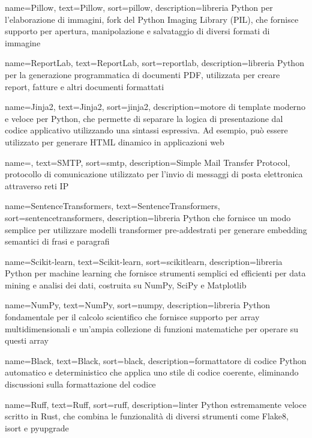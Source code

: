  {
    name=Pillow,
    text=Pillow,
    sort=pillow,
    description={libreria Python per l'elaborazione di immagini, fork del Python Imaging Library (PIL), che fornisce supporto per apertura, manipolazione e salvataggio di diversi formati di immagine}
}

 {
    name=ReportLab,
    text=ReportLab,
    sort=reportlab,
    description={libreria Python per la generazione programmatica di documenti PDF, utilizzata per creare report, fatture e altri documenti formattati}
}

 {
    name=Jinja2,
    text=Jinja2,
    sort=jinja2,
    description={motore di template moderno e veloce per Python, che permette di separare la logica di presentazione dal codice applicativo utilizzando una sintassi espressiva. Ad esempio, può essere utilizzato per generare HTML dinamico in applicazioni web}
}

 {
    name=,
    text=SMTP,
    sort=smtp,
    description={Simple Mail Transfer Protocol, protocollo di comunicazione utilizzato per l'invio di messaggi di posta elettronica attraverso reti IP}
}

 {
    name=SentenceTransformers,
    text=SentenceTransformers,
    sort=sentencetransformers,
    description={libreria Python che fornisce un modo semplice per utilizzare modelli transformer pre-addestrati per generare embedding semantici di frasi e paragrafi}
}

 {
    name=Scikit-learn,
    text=Scikit-learn,
    sort=scikitlearn,
    description={libreria Python per machine learning che fornisce strumenti semplici ed efficienti per data mining e analisi dei dati, costruita su NumPy, SciPy e Matplotlib}
}

 {
    name=NumPy,
    text=NumPy,
    sort=numpy,
    description={libreria Python fondamentale per il calcolo scientifico che fornisce supporto per array multidimensionali e un'ampia collezione di funzioni matematiche per operare su questi array}
}

 {
    name=Black,
    text=Black,
    sort=black,
    description={formattatore di codice Python automatico e deterministico che applica uno stile di codice coerente, eliminando discussioni sulla formattazione del codice}
}

 {
    name=Ruff,
    text=Ruff,
    sort=ruff,
    description={linter Python estremamente veloce scritto in Rust, che combina le funzionalità di diversi strumenti come Flake8, isort e pyupgrade}
}

